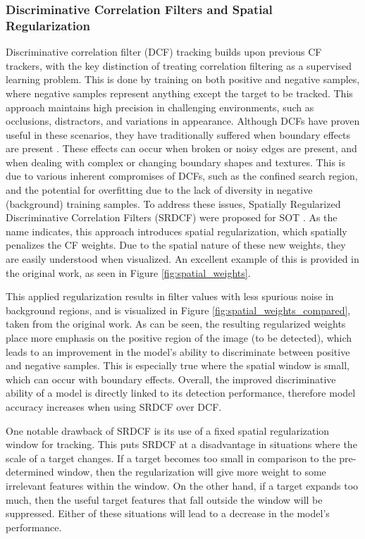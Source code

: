 \documentclass[11pt, letterpaper]{article}
\begin{document}
\subsubsection{Discriminative Correlation Filters and Spatial Regularization}

Discriminative correlation filter (DCF) tracking builds upon previous CF trackers, with the key distinction of treating correlation filtering as a supervised learning problem. This is done by training on both positive and negative samples, where negative samples represent anything except the target to be tracked. This approach maintains high precision in challenging environments, such as occlusions, distractors, and variations in appearance. Although DCFs have proven useful in these scenarios, they have traditionally suffered when boundary effects are present \cite{zhu_efficient_2021}. These effects can occur when broken or noisy edges are present, and when dealing with complex or changing boundary shapes and textures. This is due to various inherent compromises of DCFs, such as the confined search region, and the potential for overfitting due to the lack of diversity in negative (background) training samples. To address these issues, Spatially Regularized Discriminative Correlation Filters (SRDCF) were proposed for SOT \cite{danelljan_learning_2015}. As the name indicates, this approach introduces spatial regularization, which spatially penalizes the CF weights. Due to the spatial nature of these new weights, they are easily understood when visualized. An excellent example of this is provided in the original work, as seen in Figure \ref{fig:spatial_weights}.

This applied regularization results in filter values with less spurious noise in background regions, and is visualized in Figure \ref{fig:spatial_weights_compared}, taken from the original work. As can be seen, the resulting regularized weights place more emphasis on the positive region of the image (to be detected), which leads to an improvement in the model's ability to discriminate between positive and negative samples. This is especially true where the spatial window is small, which can occur with boundary effects. Overall, the improved discriminative ability of a model is directly linked to its detection performance, therefore model accuracy increases when using SRDCF over DCF. 

One notable drawback of SRDCF is its use of a fixed spatial regularization window for tracking. This puts SRDCF at a disadvantage in situations where the scale of a target changes. If a target becomes too small in comparison to the pre-determined window, then the regularization will give more weight to some irrelevant features within the window. On the other hand, if a target expands too much, then the useful target features that fall outside the window will be suppressed. Either of these situations will lead to a decrease in the model's performance.
\end{document}
